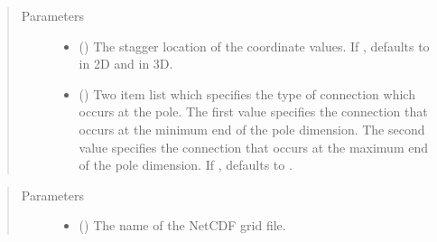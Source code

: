 \documentclass[letterpaper,10pt,english]{sphinxmanual}
\begin{document}
\begin{fulllineitems}
\begin{quote}
\begin{description}
\begin{itemize}
\end{itemize}

\end{description}\end{quote}

\begin{quote}\begin{description}
\item[{Parameters}] \leavevmode\begin{itemize}
\item {} 
 ({\hyperref[\detokenize{StaggerLoc:ESMF.api.constants.StaggerLoc}]{}}) \textendash{} The stagger location of the coordinate values.
If , defaults to {\hyperref[\detokenize{StaggerLoc:ESMF.api.constants.StaggerLoc.CENTER}]{}}
in 2D and {\hyperref[\detokenize{StaggerLoc:ESMF.api.constants.StaggerLoc.CENTER_VCENTER}]{}} in 3D.

\item {} 
 ({\hyperref[\detokenize{PoleKind:ESMF.api.constants.PoleKind}]{}}) \textendash{} Two item list which specifies the type of
connection which occurs at the pole. The first value specifies the
connection that occurs at the minimum end of the pole dimension. 
The second value specifies the connection that occurs at the maximum 
end of the pole dimension.
If , defaults to {\hyperref[\detokenize{PoleKind:ESMF.api.constants.PoleKind.MONOPOLE}]{}}.

\end{itemize}

\end{description}\end{quote}


\begin{quote}\begin{description}
\item[{Parameters}] \leavevmode\begin{itemize}
\item {} 
 () \textendash{} The name of the NetCDF grid file.


\end{itemize}
\end{description}
\end{quote}
\end{fulllineitems}
\end{document}
